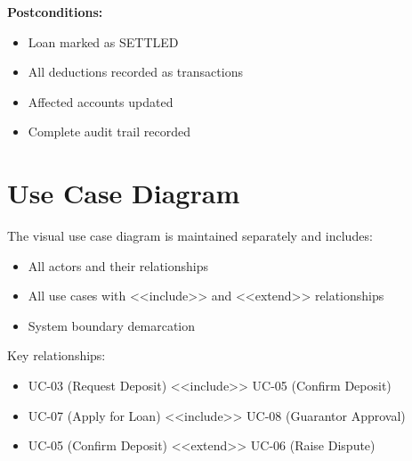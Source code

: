 \documentclass[11pt,a4paper]{article}
\begin{document}
\textbf{Postconditions:}
\begin{itemize}
    \item Loan marked as SETTLED
    \item All deductions recorded as transactions
    \item Affected accounts updated
    \item Complete audit trail recorded
\end{itemize}

\section{Use Case Diagram}

The visual use case diagram is maintained separately and includes:
\begin{itemize}
    \item All actors and their relationships
    \item All use cases with <<include>> and <<extend>> relationships
    \item System boundary demarcation
\end{itemize}

Key relationships:
\begin{itemize}
    \item UC-03 (Request Deposit) <<include>> UC-05 (Confirm Deposit)
    \item UC-07 (Apply for Loan) <<include>> UC-08 (Guarantor Approval)
    \item UC-05 (Confirm Deposit) <<extend>> UC-06 (Raise Dispute)
\end{itemize}
\end{document}
